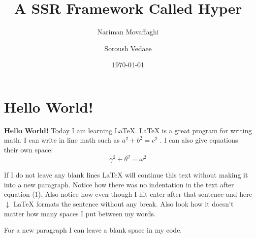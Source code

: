 \documentclass{article}
\title{A SSR Framework Called Hyper}
\author{Nariman Movaffaghi}
\author{Soroush Vedaee}
\date{\today}
\begin{document}
\maketitle
\section{Hello World!}

\textbf{Hello World!} Today I am learning \LaTeX.
\LaTeX{} is a great program for writing math. I can write in line math such as $a^2+b^2=c^2$
. I can also give equations their own space:
\begin{equation}
	\gamma^2+\theta^2=\omega^2
\end{equation}


If I do not leave any blank lines \LaTeX{} will continue  this text without making it into a new paragraph.  Notice how there was no indentation in the text after equation (1).
Also notice how even though I hit enter after that sentence and here $\downarrow$
\LaTeX{} formats the sentence without any break.  Also   look  how      it   doesn't     matter          how    many  spaces     I put     between       my    words.

For a new paragraph I can leave a blank space in my code.
\end{document}
